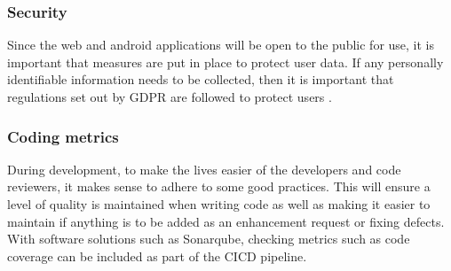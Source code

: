 \subsubsection{Security}
Since the web and android applications will be open to the public for use, it is important that measures are put in place to protect user data. 
If any personally identifiable information needs to be collected, then it is important that regulations set out by GDPR are followed to 
protect users \cite{eu2016gdpr}.

\subsubsection{Coding metrics}
During development, to make the lives easier of the developers and code reviewers, it makes sense to adhere to some good practices. 
This will ensure a level of quality is maintained when writing code as well as making it easier to maintain if anything is to be added as an 
enhancement request or fixing defects. 
With software solutions such as Sonarqube, checking metrics such as code coverage can be included as part of the CICD pipeline.

